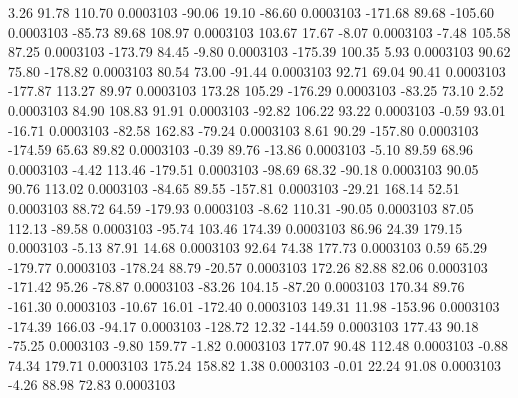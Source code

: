         3.26       91.78      110.70     0.0003103
      -90.06       19.10      -86.60     0.0003103
     -171.68       89.68     -105.60     0.0003103
      -85.73       89.68      108.97     0.0003103
      103.67       17.67       -8.07     0.0003103
       -7.48      105.58       87.25     0.0003103
     -173.79       84.45       -9.80     0.0003103
     -175.39      100.35        5.93     0.0003103
       90.62       75.80     -178.82     0.0003103
       80.54       73.00      -91.44     0.0003103
       92.71       69.04       90.41     0.0003103
     -177.87      113.27       89.97     0.0003103
      173.28      105.29     -176.29     0.0003103
      -83.25       73.10        2.52     0.0003103
       84.90      108.83       91.91     0.0003103
      -92.82      106.22       93.22     0.0003103
       -0.59       93.01      -16.71     0.0003103
      -82.58      162.83      -79.24     0.0003103
        8.61       90.29     -157.80     0.0003103
     -174.59       65.63       89.82     0.0003103
       -0.39       89.76      -13.86     0.0003103
       -5.10       89.59       68.96     0.0003103
       -4.42      113.46     -179.51     0.0003103
      -98.69       68.32      -90.18     0.0003103
       90.05       90.76      113.02     0.0003103
      -84.65       89.55     -157.81     0.0003103
      -29.21      168.14       52.51     0.0003103
       88.72       64.59     -179.93     0.0003103
       -8.62      110.31      -90.05     0.0003103
       87.05      112.13      -89.58     0.0003103
      -95.74      103.46      174.39     0.0003103
       86.96       24.39      179.15     0.0003103
       -5.13       87.91       14.68     0.0003103
       92.64       74.38      177.73     0.0003103
        0.59       65.29     -179.77     0.0003103
     -178.24       88.79      -20.57     0.0003103
      172.26       82.88       82.06     0.0003103
     -171.42       95.26      -78.87     0.0003103
      -83.26      104.15      -87.20     0.0003103
      170.34       89.76     -161.30     0.0003103
      -10.67       16.01     -172.40     0.0003103
      149.31       11.98     -153.96     0.0003103
     -174.39      166.03      -94.17     0.0003103
     -128.72       12.32     -144.59     0.0003103
      177.43       90.18      -75.25     0.0003103
       -9.80      159.77       -1.82     0.0003103
      177.07       90.48      112.48     0.0003103
       -0.88       74.34      179.71     0.0003103
      175.24      158.82        1.38     0.0003103
       -0.01       22.24       91.08     0.0003103
       -4.26       88.98       72.83     0.0003103
